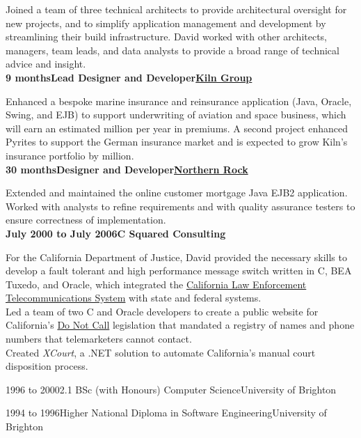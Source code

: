 \documentclass[a4paper,12pt]{article}
\newcommand{\head}[1]{\begin{center}{\large{\textbf{\sc{#1}}}}\nopagebreak\end{center}}
\newcommand{\jobheld}[2]{\textbf{#1\hfill #2}\nopagebreak}
\newcommand{\clientwork}[3]{\textbf{#1\hfill#3\hfill#2}\nopagebreak}
\newcommand{\tab}{\hspace{2em}}
\newcommand{\education}[3]{#1\tab#2\hfill#3}
\begin{document}
Joined a team of three technical architects to provide architectural oversight for new projects, and to simplify application management and development by streamlining their build infrastructure. David worked with other architects, managers, team leads, and data analysts to provide a broad range of technical advice and insight.\\

\clientwork{9 months}{\href{http://kilngroup.com/}{Kiln Group}}{Lead Designer and Developer}

Enhanced a bespoke marine insurance and reinsurance application (Java, Oracle, Swing, and EJB) to support underwriting of aviation and space business, which will earn an estimated  million per year in premiums. A second project enhanced Pyrites to support the German insurance market and is expected to grow  Kiln's insurance portfolio by  million.\\

\clientwork{30 months}{\href{http://www.northernrock.co.uk}{Northern Rock}}{Designer and Developer}

Extended and maintained the online customer mortgage Java EJB2 application. Worked with analysts to refine requirements and with quality assurance testers to ensure correctness of implementation.\\

\jobheld{July 2000 to July 2006}{C Squared Consulting}

For the California Department of Justice, David provided the necessary skills to develop a fault tolerant and high performance message switch written in C, BEA Tuxedo, and Oracle, which integrated the \href{http://definitions.uslegal.com/c/clets/}{California Law Enforcement Telecommunications System} with state and federal systems.\\

Led a team of two C and Oracle developers to create a public website for California's \href{http://www.sfgate.com/cgi-bin/article.cgi?f=/c/a/2003/03/31/MN5478.DTL}{Do Not Call} legislation that mandated a registry of names and phone numbers that telemarketers cannot contact.\\

Created \emph{XCourt}, a .NET solution to automate California's manual court disposition process.\\

\head{Education}

\education{1996 to 2000}{2.1 BSc (with Honours) Computer Science}{University of Brighton}

\education{1994 to 1996}{Higher National Diploma in Software Engineering}{University of Brighton}
\end{document}
